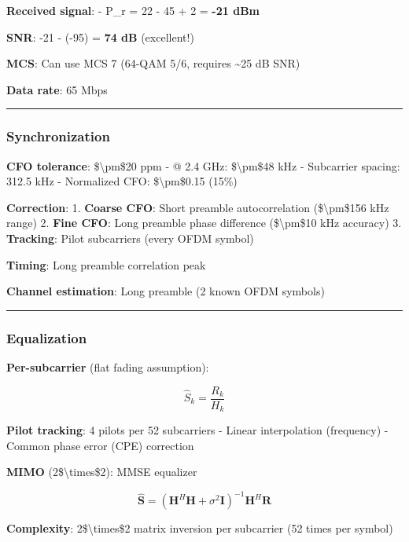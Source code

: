 \textbf{Received signal}: - P\_r = 22 - 45 + 2 = \textbf{-21 dBm}

\textbf{SNR}: -21 - (-95) = \textbf{74 dB} (excellent!)

\textbf{MCS}: Can use MCS 7 (64-QAM 5/6, requires \textasciitilde25 dB
SNR)

\textbf{Data rate}: 65 Mbps

\begin{center}\rule{0.5\linewidth}{0.5pt}\end{center}

\subsubsection{Synchronization}\label{synchronization}

\textbf{CFO tolerance}: \$\textbackslash pm\$20 ppm - @ 2.4 GHz:
\$\textbackslash pm\$48 kHz - Subcarrier spacing: 312.5 kHz - Normalized
CFO: \$\textbackslash pm\$0.15 (15\%)

\textbf{Correction}: 1. \textbf{Coarse CFO}: Short preamble
autocorrelation (\$\textbackslash pm\$156 kHz range) 2. \textbf{Fine
CFO}: Long preamble phase difference (\$\textbackslash pm\$10 kHz
accuracy) 3. \textbf{Tracking}: Pilot subcarriers (every OFDM symbol)

\textbf{Timing}: Long preamble correlation peak

\textbf{Channel estimation}: Long preamble (2 known OFDM symbols)

\begin{center}\rule{0.5\linewidth}{0.5pt}\end{center}

\subsubsection{Equalization}\label{equalization}

\textbf{Per-subcarrier} (flat fading assumption):

\[
\hat{S}_k = \frac{R_k}{H_k}
\]

\textbf{Pilot tracking}: 4 pilots per 52 subcarriers - Linear
interpolation (frequency) - Common phase error (CPE) correction

\textbf{MIMO} (2\$\textbackslash times\$2): MMSE equalizer

\[
\hat{\mathbf{S}} = (\mathbf{H}^H \mathbf{H} + \sigma^2 \mathbf{I})^{-1} \mathbf{H}^H \mathbf{R}
\]

\textbf{Complexity}: 2\$\textbackslash times\$2 matrix inversion per
subcarrier (52 times per symbol)

